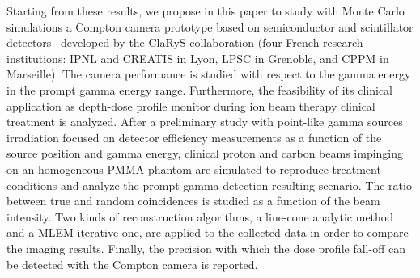 Starting from these results, we propose in this paper to study with Monte Carlo simulations a Compton camera prototype based on semiconductor and scintillator detectors~\cite{krimmer:hal-01101334} developed by the ClaRyS collaboration (four French research institutions: IPNL and CREATIS in Lyon, LPSC in Grenoble, and CPPM in Marseille). %
The camera performance is studied with respect to the gamma energy in the prompt gamma energy range. Furthermore, the feasibility of its clinical application as depth-dose profile monitor during ion beam therapy clinical treatment is analyzed. After a preliminary study with point-like gamma sources irradiation focused on detector efficiency measurements as a function of the source position and gamma energy, clinical proton and carbon beams impinging on an homogeneous PMMA phantom are simulated to reproduce treatment conditions and analyze the prompt gamma detection resulting scenario. The ratio between true and random coincidences is studied as a function of the beam intensity. Two kinds of reconstruction algorithms, a line-cone analytic method and a MLEM iterative one, are applied to the collected data in order to compare the imaging results. Finally, the precision with which the dose profile fall-off can be detected with the Compton camera is reported.   



